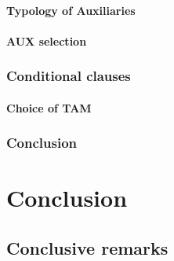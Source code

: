 \documentclass[
  a4paper,
  twoside,
  12pt,
  chapterprefix=false,
  bibliography=totocnumbered,
  listof=flat]{scrbook}
\begin{document}
\hypertarget{typology-of-auxiliaries}{%
\subsection{Typology of Auxiliaries}\label{typology-of-auxiliaries}}

\hypertarget{aux-selection}{%
\subsection{AUX selection}\label{aux-selection}}

\hypertarget{conditional-clauses}{%
\section{Conditional clauses}\label{conditional-clauses}}

\hypertarget{choice-of-tam}{%
\subsection{Choice of TAM}\label{choice-of-tam}}

\hypertarget{conclusion-2}{%
\section{Conclusion}\label{conclusion-2}}

\part{Conclusion}

\hypertarget{conclusive-remarks}{%
\chapter{Conclusive remarks}\label{conclusive-remarks}}

  
\end{document}
